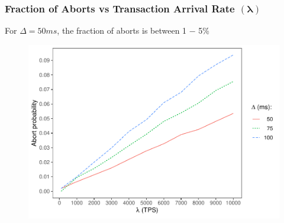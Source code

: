 \begin{frame}
  \frametitle{Fraction of Aborts vs Transaction Arrival Rate $(\boldsymbol{\lambda})$}
  \begin{center}
    For $\Delta = 50 ms$, the fraction of aborts is between 1 − 5\%
  \end{center}
    \begin{figure}[h!]
    \centering
    \includegraphics[scale=0.5]{./figures/aborts}
  \end{figure}
\end{frame}